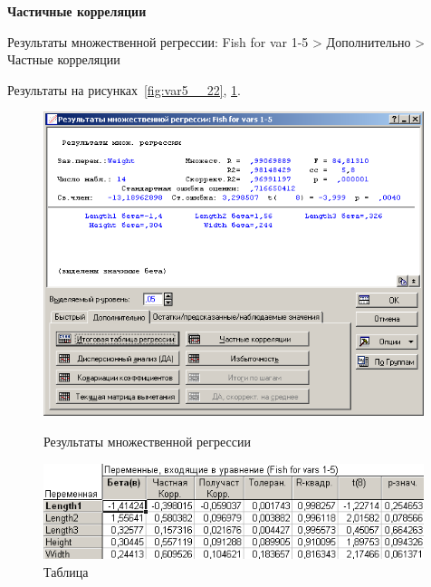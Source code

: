 \begin{center}
  \textbf{Частичные корреляции}
\end{center}

Результаты множественной регрессии: Fish for var 1-5 > Дополнительно > Частные корреляции

Результаты на рисунках~\ref{fig:var5__22}, \ref{fig:var5__23}.

\begin{figure}[!h]
  \centering
  \begin{minipage}{0.49\textwidth}
    \centering

    \includegraphics[width=0.99\textwidth]
    {inc/var5__22.PNG}

    \caption{Результаты множественной регрессии}
    \label{fig:var5__22}
  \end{minipage}
  \begin{minipage}{0.49\textwidth}
    \centering

    \includegraphics[width=0.99\textwidth]
    {inc/var5__23.PNG}

    \caption{Таблица}
    \label{fig:var5__23}
  \end{minipage}
\end{figure}

